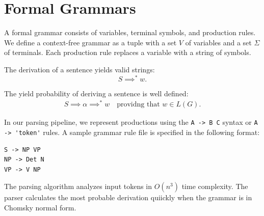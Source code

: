 \documentclass{article}
\begin{document}
\section{Formal Grammars}

A formal grammar consists of variables, terminal symbols, and production rules.
We define a context-free grammar as a tuple with a set $V$ of variables and a set $\Sigma$ of terminals.
Each production rule replaces a variable with a string of symbols.

The derivation of a sentence yields valid strings:
\begin{equation}
    S \implies^* w.
\end{equation}

The yield probability of deriving a sentence is well defined:
\begin{align*}
    S \implies \alpha \implies^* w \quad \text{providng that } w \in L(G).
\end{align*}

In our parsing pipeline, we represent productions using the \verb|A -> B C| syntax or \lstinline{A -> 'token'} rules.
A sample grammar rule file is specified in the following format:
\begin{lstlisting}[language=caml]
S -> NP VP
NP -> Det N
VP -> V NP
\end{lstlisting}

The parsing algorithm analyzes input tokens in $O(n^3)$ time complexity.
The parser calculates the most probable derivation quiickly when the grammar is in Chomsky normal form.
\end{document}
